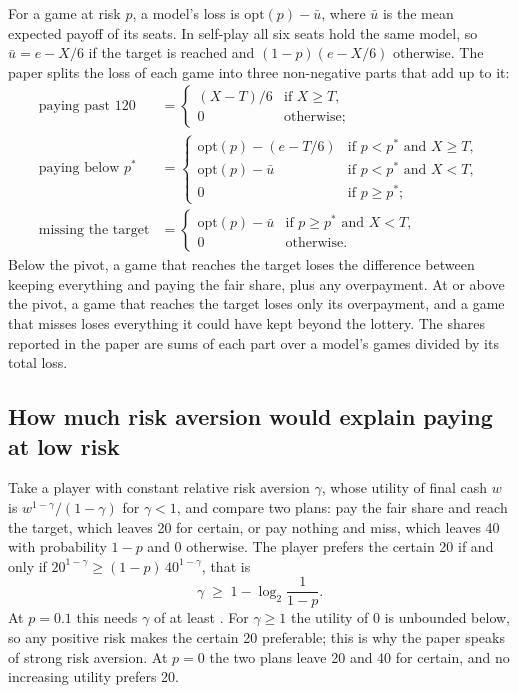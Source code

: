 \documentclass[10pt]{article}
\let\plainsubsection\subsection
\renewcommand{\subsection}{\FloatBarrier\needspace{8\baselineskip}\plainsubsection}
\newcommand{\popt}{p^{*}}
\begin{document}
For a game at risk $p$, a model's loss is $\mathrm{opt}(p)-\bar u$, where $\bar u$ is the mean expected payoff of its seats. In self-play all six seats hold the same model, so $\bar u = e-X/6$ if the target is reached and $(1-p)(e-X/6)$ otherwise. The paper splits the loss of each game into three non-negative parts that add up to it:
\begin{align*}
\text{paying past 120} &= \begin{cases}(X-T)/6 & \text{if } X\ge T,\\ 0 & \text{otherwise;}\end{cases}\\
\text{paying below } \popt &= \begin{cases}\mathrm{opt}(p)-(e-T/6) & \text{if } p<\popt \text{ and } X\ge T,\\ \mathrm{opt}(p)-\bar u & \text{if } p<\popt \text{ and } X<T,\\ 0 & \text{if } p\ge\popt;\end{cases}\\
\text{missing the target} &= \begin{cases}\mathrm{opt}(p)-\bar u & \text{if } p\ge\popt \text{ and } X<T,\\ 0 & \text{otherwise.}\end{cases}
\end{align*}
Below the pivot, a game that reaches the target loses the difference between keeping everything and paying the fair share, plus any overpayment. At or above the pivot, a game that reaches the target loses only its overpayment, and a game that misses loses everything it could have kept beyond the lottery. The shares reported in the paper are sums of each part over a model's games divided by its total loss.

\subsection{How much risk aversion would explain paying at low risk}
\label{sec:crra}

Take a player with constant relative risk aversion $\gamma$, whose utility of final cash $w$ is $w^{1-\gamma}/(1-\gamma)$ for $\gamma<1$, and compare two plans: pay the fair share and reach the target, which leaves 20 for certain, or pay nothing and miss, which leaves 40 with probability $1-p$ and 0 otherwise. The player prefers the certain 20 if and only if $20^{1-\gamma}\ge(1-p)\,40^{1-\gamma}$, that is
\[
\gamma \;\ge\; 1-\log_2\frac{1}{1-p}.
\]
At $p=0.1$ this needs $\gamma$ of at least \GridCrraLow{}. For $\gamma\ge1$ the utility of 0 is unbounded below, so any positive risk makes the certain 20 preferable; this is why the paper speaks of strong risk aversion. At $p=0$ the two plans leave 20 and 40 for certain, and no increasing utility prefers 20.
\end{document}
